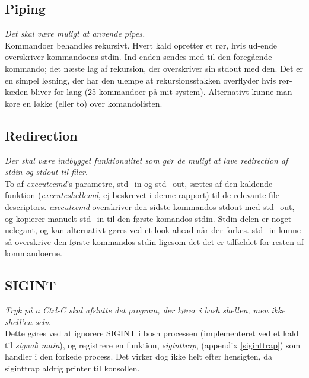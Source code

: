 \documentclass[a4paper, titlepage]{article}
\begin{document}
\subsection*{Piping}
\textit{Det skal være muligt at anvende pipes.}\\

Kommandoer behandles rekursivt.
Hvert kald opretter et rør, hvis ud-ende overskriver kommandoens stdin.
Ind-enden sendes med til den foregående kommando;
det næste lag af rekursion, der overskriver sin stdout med den.
Det er en simpel løsning, der har den ulempe at rekursionsstakken overflyder
hvis rør-kæden bliver for lang (25 kommandoer på mit system).
Alternativt kunne man køre en løkke (eller to) over komandolisten.

\subsection*{Redirection}
\textit{ Der skal være indbygget funktionalitet som gør de muligt at lave redirection
af stdin og stdout til filer.}\\

To af \emph{executecmd}'s parametre, std\_in og std\_out, sættes af den kaldende
funktion (\emph{executeshellcmd}, ej beskrevet i denne rapport) til de
relevante file descriptors. \emph{executecmd} overskriver den sidste kommandos
stdout med std\_out, og kopierer manuelt std\_in til den første komandos stdin.
Stdin delen er noget uelegant, og kan alternativt gøres ved et look-ahead når
der forkes. std\_in kunne så overskrive den første kommandos stdin ligesom det
det er tilfældet for resten af kommandoerne.

\subsection*{SIGINT}
\textit{ Tryk på a Ctrl-C skal afslutte det program, der kører i bosh shellen, men ikke
	shell'en selv.}\\

Dette gøres ved at ignorere SIGINT i bosh processen (implementeret ved et kald
til \emph{signal}i \emph{main}), og registrere en funktion, \emph{siginttrap},
(appendix \ref{siginttrap}) som handler i den forkede process. Det virker dog
ikke helt efter hensigten, da siginttrap aldrig printer til konsollen.

\newpage
\appendix

\pagebreak

\pagebreak

\pagebreak

\end{document}
